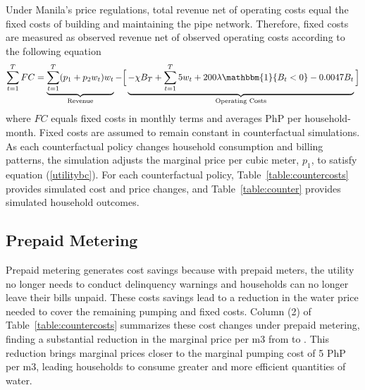 \documentclass[12pt,table]{article}
\begin{document}
Under Manila's price regulations, total revenue net of operating costs equal the fixed costs of building and maintaining the pipe network.  Therefore, fixed costs are measured as observed revenue net of observed operating costs according to the following equation
\begin{align}
\label{utilitybc}
\sum_{t=1}^{T} FC = \underbrace{\sum_{t=1}^{T} (p_1+p_2 w_t)w_t}_{\text{Revenue}}  - \Big[ \underbrace{-\chi B_T +  \sum_{t=1}^{T} 5 w_t + 200 \lambda \mathbbm{1}\{B_t < 0 \} - 0.0047 B_t}_{\text{Operating Costs}} \Big]
\end{align}
where $FC$ equals fixed costs in monthly terms and averages PhP per household-month.  Fixed costs are assumed to remain constant in counterfactual simulations.  As each counterfactual policy changes household consumption and billing patterns, the simulation adjusts the marginal price per cubic meter, $p_1$, to satisfy equation (\ref{utilitybc}).  For each counterfactual policy, Table~\ref{table:countercosts} provides simulated cost and price changes, and Table~\ref{table:counter} provides simulated household outcomes.  




\subsection{Prepaid Metering}

Prepaid metering generates cost savings because with prepaid meters, the utility no longer needs to conduct delinquency warnings and households can no longer leave their bills unpaid.  These costs savings lead to a reduction in the water price needed to cover the remaining pumping and fixed costs.  Column (2) of Table~\ref{table:countercosts} summarizes these cost changes under prepaid metering, finding a substantial reduction in the marginal price per m3 from to \unskip.  This reduction brings marginal prices closer to the marginal pumping cost of 5 PhP per m3, leading households to consume greater and more efficient quantities of water.
\end{document}

